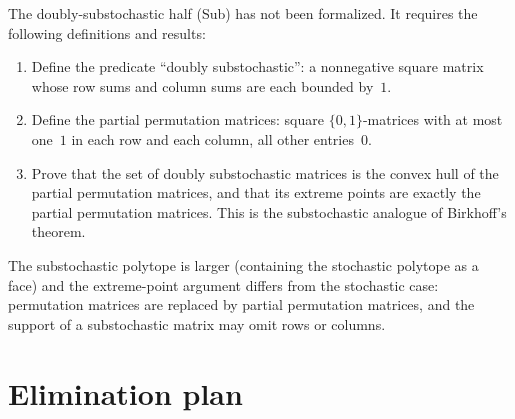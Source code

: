 \documentclass{article}
\begin{document}
The doubly-substochastic half (Sub) has not been formalized.  It requires
the following definitions and results:
\begin{enumerate}
  \item Define the predicate ``doubly substochastic'': a nonnegative square
    matrix whose row sums and column sums are each bounded by~$1$.
  \item Define the partial permutation matrices: square $\{0,1\}$-matrices
    with at most one~$1$ in each row and each column, all other entries~$0$.
  \item Prove that the set of doubly substochastic matrices is the convex hull
    of the partial permutation matrices, and that its extreme points are
    exactly the partial permutation matrices.  This is the substochastic
    analogue of Birkhoff's theorem.
\end{enumerate}
The substochastic polytope is larger (containing the stochastic polytope as a
face) and the extreme-point argument differs from the stochastic case:
permutation matrices are replaced by partial permutation matrices, and the
support of a substochastic matrix may omit rows or columns.

\section{Elimination plan}
\end{document}
